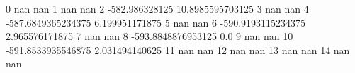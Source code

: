 0 nan nan
1 nan nan
2 -582.986328125 10.8985595703125
3 nan nan
4 -587.6849365234375 6.199951171875
5 nan nan
6 -590.9193115234375 2.965576171875
7 nan nan
8 -593.8848876953125 0.0
9 nan nan
10 -591.8533935546875 2.031494140625
11 nan nan
12 nan nan
13 nan nan
14 nan nan
